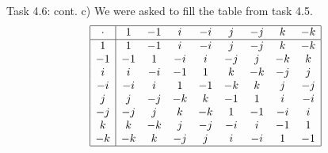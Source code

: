\documentclass[aspectratio=169]{beamer}
\begin{document}
\begin{frame}[fragile]{Task 4.6: cont.}
c) We were asked to fill the table from task 4.5.
\[
\begin{array}{|c|c c c c c c c c|}
\hline
\cdot & 1 & -1 & i & -i & j & -j & k & -k \\
\hline
1 & 1 & -1 & i & -i & j & -j & k & -k \\

-1 & -1 & 1 & -i & i & -j & j & -k & k \\

i & i & -i & -1 & 1 & k & -k & -j & j \\

-i & -i & i & 1 & -1 & -k & k & j & -j \\

j & j & -j & -k & k & -1 & 1 & i & -i \\

-j & -j & j & k & -k & 1 & -1 & -i & i \\

k & k & -k & j & -j & -i & i & -1 & 1 \\

-k & -k & k & -j & j & i & -i & 1 & -1 \\
\hline
\end{array}
\]
\end{frame}
\end{document}
